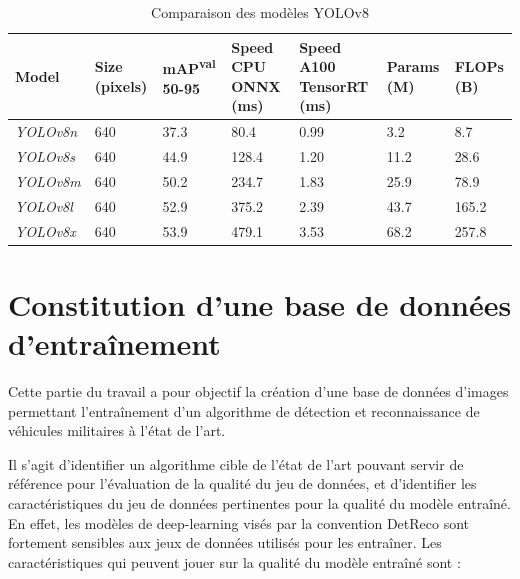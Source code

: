 \begin{table}[H]
    \centering
    \begin{tabular}{|p{2cm}|p{2cm}|p{1.7cm}|p{2.4cm}|p{2.4cm}|p{1.7cm}|p{1.7cm}|}
        \hline
        \textbf{Model}   & \textbf{Size (pixels)} & \textbf{mAP\textsuperscript{val} 50-95} & \textbf{Speed CPU ONNX (ms)} & \textbf{Speed A100 TensorRT (ms)} & \textbf{Params (M)} & \textbf{FLOPs (B)} \\ \hline
        \textit{YOLOv8n} & 640                    & 37.3                                    & 80.4                         & 0.99                              & 3.2                 & 8.7                \\ \hline
        \textit{YOLOv8s} & 640                    & 44.9                                    & 128.4                        & 1.20                              & 11.2                & 28.6               \\ \hline
        \textit{YOLOv8m} & 640                    & 50.2                                    & 234.7                        & 1.83                              & 25.9                & 78.9               \\ \hline
        \textit{YOLOv8l} & 640                    & 52.9                                    & 375.2                        & 2.39                              & 43.7                & 165.2              \\ \hline
        \textit{YOLOv8x} & 640                    & 53.9                                    & 479.1                        & 3.53                              & 68.2                & 257.8              \\ \hline
    \end{tabular}
    \caption{Comparaison des modèles YOLOv8 \cite{jocher2023yolo}}
    \label{tab:yolov8_comparaison}
\end{table}




\section{Constitution d’une base de données d’entraînement}

Cette partie du travail a pour objectif la création d'une base de données d’images permettant l’entraînement d’un algorithme de détection et reconnaissance de véhicules militaires à l'état de l'art.

Il s’agit d’identifier un algorithme cible de l’état de l’art pouvant servir de référence pour l’évaluation de la qualité du jeu de données, et d’identifier les caractéristiques du jeu de données pertinentes pour la qualité du modèle entraîné.
En effet, les modèles de deep-learning visés par la convention DetReco sont fortement sensibles aux jeux de données utilisés pour les entraîner.
Les caractéristiques qui peuvent jouer sur la qualité du modèle entraîné sont :

